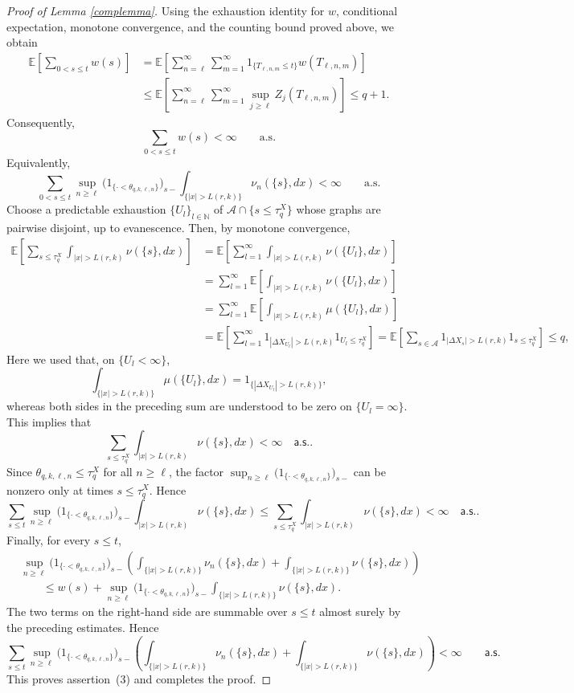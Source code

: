 \documentclass[a4paper,10pt]{article}
\newcommand{\E}{\mathbb E}
\newcommand{\N}{\mathbb N}
\begin{document}
\begin{proof}[Proof of Lemma \ref{complemma}]
Using the exhaustion identity for \(w\), conditional expectation,
monotone convergence, and the counting bound proved above, we obtain
\[
\begin{aligned}
\E\left[
\sum_{0<s\le t}w(s)
\right]
&=
\E\left[
\sum_{n=\ell}^{\infty}
\sum_{m=1}^{\infty}
1_{\{T_{\ell,n,m}\le t\}}
w(T_{\ell,n,m})
\right]
\\
&\le
\E\left[
\sum_{n=\ell}^{\infty}
\sum_{m=1}^{\infty}
\sup_{j\ge\ell}
Z_j(T_{\ell,n,m})
\right]
\le
q+1.
\end{aligned}
\]
Consequently,
\[
\sum_{0<s\le t}w(s)
<\infty
\qquad\text{a.s.}
\]
Equivalently,
\[
\sum_{0<s\le t}
\sup_{n\ge\ell}
\bigl(
1_{\{\cdot<\theta_{q,k,\ell,n}\}}
\bigr)_{s-}
\int_{\{|x|>L(r,k)\}}
\nu_n(\{s\},dx)
<\infty
\qquad\text{a.s.}
\]
Choose a predictable exhaustion
\(\{U_l\}_{l\in\N}\) of
\(\mathcal A\cap\{s\le\tau_q^X\}\)
whose graphs are pairwise disjoint, up to evanescence. Then, by
monotone convergence,
\begin{align*}
\E\left[\sum_{s\le \tau_{q}^X} \int_{|x|>L(r,k)}\nu(\{s\},dx)\right]
&=
\E\left[\sum_{l=1}^\infty \int_{|x|>L(r,k)}\nu(\{U_l\},dx)\right]
\\
&=
\sum_{l=1}^\infty\E\left[\int_{|x|>L(r,k)}\nu(\{U_l\},dx)\right]
\\
&=
\sum_{l=1}^\infty\E\left[\int_{|x|>L(r,k)}\mu(\{U_l\},dx)\right]
\\
&=
\E\left[\sum_{l=1}^\infty 1_{|\Delta X_{U_l}|>L(r,k)}1_{U_l\le \tau_{q}^X}\right]
=
\E\left[\sum_{s\in\mathcal{A}} 1_{|\Delta X_{s}| > L(r,k)}1_{s\le \tau_{q}^X}\right]\le q,
\end{align*}
Here we used that, on \(\{U_l<\infty\}\),
\[
\int_{\{|x|>L(r,k)\}}\mu(\{U_l\},dx)
=
1_{\{|\Delta X_{U_l}|>L(r,k)\}},
\]
whereas both sides in the preceding sum are understood to be zero on
\(\{U_l=\infty\}\).
This implies that $$\sum_{s\le \tau_{q}^X} \int_{|x|>L(r,k)}\nu(\{s\},dx)<\infty\quad\textsf{a.s..}$$ 
Since \(\theta_{q,k,\ell,n}\le \tau_q^X\) for all \(n\ge\ell\), the factor
$
\sup_{n\ge\ell}
\bigl(1_{\{\cdot<\theta_{q,k,\ell,n}\}}\bigr)_{s-}
$
can be nonzero only at times \(s\le \tau_q^X\). Hence
\[
\sum_{s\le t}\sup_{n\ge\ell}
\bigl(1_{\{\cdot<\theta_{q,k,\ell,n}\}}\bigr)_{s-}
\int_{|x|>L(r,k)}\nu(\{s\},dx)
\le
\sum_{s\le \tau_q^X}
\int_{|x|>L(r,k)}\nu(\{s\},dx)
<\infty \quad\textsf{a.s.}.
\]
Finally, for every \(s\le t\),
\[
\begin{aligned}
&\sup_{n\ge\ell}
\bigl(
1_{\{\cdot<\theta_{q,k,\ell,n}\}}
\bigr)_{s-}
\left(
\int_{\{|x|>L(r,k)\}}\nu_n(\{s\},dx)
+
\int_{\{|x|>L(r,k)\}}\nu(\{s\},dx)
\right)
\\
&\qquad\le
w(s)
+
\sup_{n\ge\ell}
\bigl(
1_{\{\cdot<\theta_{q,k,\ell,n}\}}
\bigr)_{s-}
\int_{\{|x|>L(r,k)\}}\nu(\{s\},dx).
\end{aligned}
\]
The two terms on the right-hand side are summable over \(s\le t\)
almost surely by the preceding estimates. Hence
\[
\sum_{s\le t}
\sup_{n\ge\ell}
\bigl(
1_{\{\cdot<\theta_{q,k,\ell,n}\}}
\bigr)_{s-}
\left(
\int_{\{|x|>L(r,k)\}}\nu_n(\{s\},dx)
+
\int_{\{|x|>L(r,k)\}}\nu(\{s\},dx)
\right)
<\infty
\qquad\textsf{a.s.}
\]
This proves assertion~(3) and completes the proof.
\end{proof}
\end{document}
